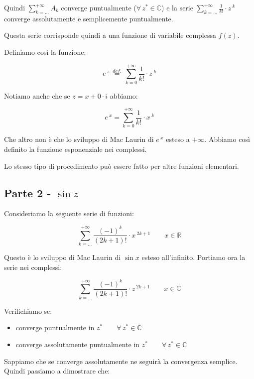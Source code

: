 \documentclass[../dimostrazioni]{subfiles}
\begin{document}
                Quindi \(\sum_{k=\dots}^{+\infty} A_k\) converge puntualmente (\(\forall \, z^* \in \mathbb{C}\)) 
                e la serie  \(\sum_{k=\dots}^{+\infty} \frac{1}{k!} \cdot z\,^k \) converge assolutamente e semplicemente puntualmente.

                Questa serie corrisponde quindi a una funzione di variabile complessa \(f(z)\).

                Definiamo così la funzione:

                \[  e\,^z \, \stackrel{def.}{=} \, \sum_{k=0}^{+\infty} \frac{1}{k!} \cdot z\,^k    \]

                Notiamo anche che se \(z = x + 0 \cdot i\) abbiamo:

                \[  e\,^x = \sum_{k=0}^{+\infty} \frac{1}{k!} \cdot x\,^k \]

                Che altro non è che lo sviluppo di Mac Laurin di \(e\,^x\) esteso a \(+\infty\). 
                Abbiamo così definito la funzione esponenziale nei complessi.

            Lo stesso tipo di procedimento può essere fatto per altre funzioni elementari.
            
            \subsection*{Parte 2 - \(\sin z\)}

                Consideriamo la seguente serie di funzioni:
            
                \[  \sum_{k=\dots}^{+\infty} \frac{(-1)^k}{(2k+1)!} \cdot x\,^{2k+1} \qquad x \in \mathbb{R}  \]

                Questo è lo sviluppo di Mac Laurin di \(\sin x\) esteso all'infinito. Portiamo ora la serie nei complessi:

                \[  \sum_{k=\dots}^{+\infty} \frac{(-1)^k}{(2k+1)!} \cdot z\,^{2k+1} \qquad x \in \mathbb{C}  \]

                Verifichiamo se:
                \begin{itemize}
                    \item converge puntualmente in \(z^* \qquad \forall \, z^*  \in \mathbb{C}\)
                    \item converge assolutamente puntualmente in \(z^* \qquad \forall \, z^*  \in \mathbb{C}\)
                \end{itemize}
            
                Sappiamo che se converge assolutamente ne seguirà la convergenza semplice. Quindi passiamo a dimostrare che:
\end{document}
